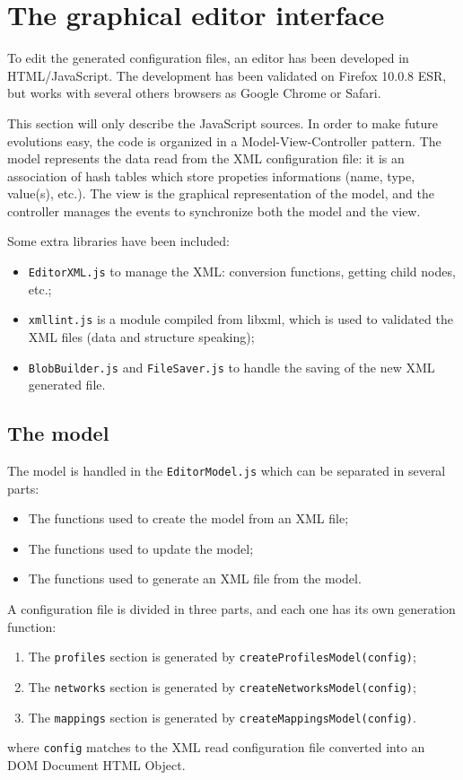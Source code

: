 \documentclass{article}
\begin{document}
\newpage

\section{The graphical editor interface}

To edit the generated configuration files, an editor has been developed in HTML/JavaScript. The development has been validated on Firefox 10.0.8 ESR, but works with several others browsers as Google Chrome or Safari.
\newline

\noindent This section will only describe the JavaScript sources. In order to make future evolutions easy, the code is organized in a Model-View-Controller pattern. The model represents the data read from the XML configuration file: it is an association of hash tables which store propeties informations (name, type, value(s), etc.). The view is the graphical representation of the model, and the controller manages the events to synchronize both the model and the view.

\noindent Some extra libraries have been included:
\begin{itemize}
\item \texttt{EditorXML.js} to manage the XML: conversion functions, getting child nodes, etc.;
\item \texttt{xmllint.js} is a module compiled from libxml, which is used to validated the XML files (data and structure speaking);
\item \texttt{BlobBuilder.js} and \texttt{FileSaver.js} to handle the saving of the new XML generated file.
\end{itemize}

\subsection{The model}

The model is handled in the \texttt{EditorModel.js} which can be separated in several parts:
\begin{itemize}
\item The functions used to create the model from an XML file;
\item The functions used to update the model;
\item The functions used to generate an XML file from the model.
\end{itemize}

\noindent A configuration file is divided in three parts, and each one has its own generation function:
\begin{enumerate}
\item The \texttt{profiles} section is generated by \texttt{createProfilesModel(config)};
\item The \texttt{networks} section is generated by \texttt{createNetworksModel(config)};
\item The \texttt{mappings} section is generated by \texttt{createMappingsModel(config)}.
\end{enumerate}
\noindent where \texttt{config} matches to the XML read configuration file converted into an DOM Document HTML Object.
\newline
\end{document}
